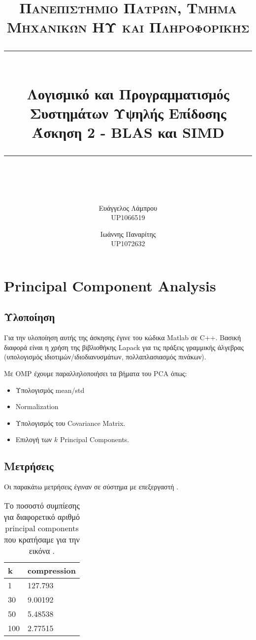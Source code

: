 \documentclass[11pt]{scrartcl} %
\title{	
	\normalfont\normalsize
	\textsc{Πανεπιστήμιο Πατρών, Τμήμα Μηχανικών ΗΥ και Πληροφορικής}\\ %
	\vspace{25pt} %
	\rule{\linewidth}{0.5pt}\\ %
	\vspace{20pt} %
	{\LARGE Λογισμικό και Προγραμματισμός Συστημάτων Υψηλής Επίδοσης\\ Άσκηση 2 - BLAS και SIMD}\\ %
	\vspace{12pt} %
	\rule{\linewidth}{2pt}\\ %
	\vspace{12pt} %
}
\author{Ευάγγελος Λάμπρου \\UP1066519 \and Ιωάννης Παναρίτης \\UP1072632} %
\date{} %
\begin{document}
\maketitle 

\section{Principal Component Analysis}

\subsection{Υλοποίηση}

Για την υλοποίηση αυτής της άσκησης έγινε  του κώδικα Matlab σε C++.
Βασική διαφορά είναι η χρήση της βιβλιοθήκης Lapack για τις πράξεις γραμμικής άλγεβρας (υπολογισμός ιδιοτιμών/ιδιοδιανυσμάτων, πολλαπλασιασμός πινάκων).

Με OMP έχουμε παραλληλοποιήσει τα βήματα του PCA όπως: 

\begin{itemize}
    \item Υπολογισμός mean/std 
    \item Normalization
    \item Υπολογισμός του Covariance Matrix.
    \item Επιλογή των $k$ Principal Components.
\end{itemize}

\subsection{Μετρήσεις}

Οι παρακάτω μετρήσεις έγιναν σε σύστημα με επεξεργαστή .

\begin{table}[H]
    \centering
    \begin{tabular}{|l|l|}
    \hline
        \textbf{k} & \textbf{compression} \\ \hline
        1 & 127.793 \\ \hline
        30 & 9.00192 \\ \hline
        50 & 5.48538 \\ \hline
        100 & 2.77515 \\ \hline
    \end{tabular}
    \caption{Το ποσοστό συμπίεσης για διαφορετικό αριθμό principal components που κρατήσαμε για την εικόνα .}
\end{table}
\end{document}
